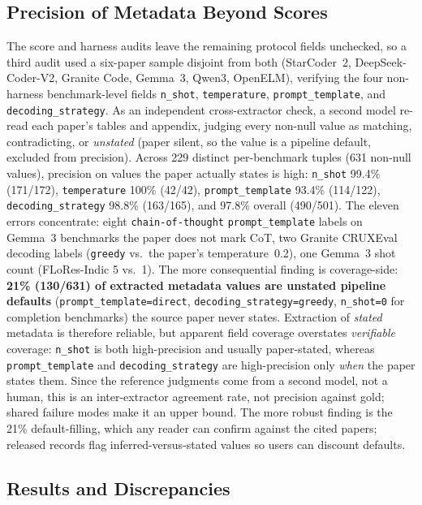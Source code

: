 \documentclass[11pt]{article}
\begin{document}
\subsection{Precision of Metadata Beyond Scores}
\label{sec:meta-ann}
The score and harness audits leave the remaining protocol fields unchecked, so a
third audit used a six-paper sample disjoint from both (StarCoder~2,
DeepSeek-Coder-V2, Granite Code, Gemma~3, Qwen3, OpenELM), verifying the four
non-harness benchmark-level fields \texttt{n\_shot}, \texttt{temperature},
\texttt{prompt\_template}, and \texttt{decoding\_strategy}. As an independent
cross-extractor check, a second model re-read each paper's tables and appendix,
judging every non-null value as matching, contradicting, or \emph{unstated} (paper
silent, so the value is a pipeline default, excluded from precision). Across 229 distinct per-benchmark
tuples (631 non-null values), precision on values the paper actually states is
high: \texttt{n\_shot} 99.4\% (171/172), \texttt{temperature} 100\% (42/42),
\texttt{prompt\_template} 93.4\% (114/122), \texttt{decoding\_strategy} 98.8\%
(163/165), and 97.8\% overall (490/501). The eleven errors concentrate: eight
\texttt{chain-of-thought} \texttt{prompt\_template} labels on Gemma~3 benchmarks the
paper does not mark CoT, two Granite CRUXEval decoding labels (\texttt{greedy} vs.\
the paper's temperature~0.2), one Gemma~3 shot count (FLoRes-Indic 5 vs.\ 1). The more consequential finding is coverage-side: \textbf{21\%
(130/631) of extracted metadata values are unstated pipeline defaults}
(\texttt{prompt\_template=direct}, \texttt{decoding\_strategy=greedy},
\texttt{n\_shot=0} for completion benchmarks) the source paper never states.
Extraction of \emph{stated} metadata is therefore reliable, but apparent field
coverage overstates \emph{verifiable} coverage: \texttt{n\_shot} is both
high-precision and usually paper-stated, whereas \texttt{prompt\_template} and
\texttt{decoding\_strategy} are high-precision only \emph{when} the paper states
them. Since the reference judgments come from a second model, not a human, this is
an inter-extractor agreement rate, not precision against gold; shared failure modes
make it an upper bound. The more robust finding is the 21\% default-filling, which
any reader can confirm against the cited papers; released records flag
inferred-versus-stated values so users can discount defaults.


\subsection{Results and Discrepancies}
\label{sec:discrepancies}
\end{document}
